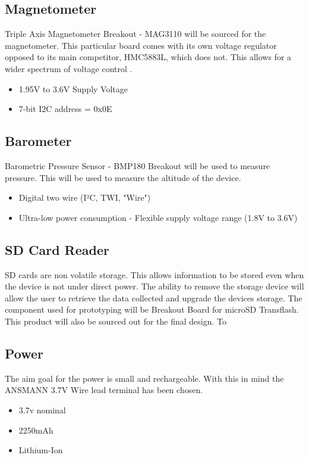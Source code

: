 \documentclass{report}
\begin{document}
\subsection{Magnetometer}
Triple Axis Magnetometer Breakout - MAG3110 will be sourced for the magnetometer. This particular board comes with its own voltage regulator opposed to its main competitor, HMC5883L, which does not. This allows for a wider spectrum of voltage control .
\begin{itemize}
\item 1.95V to 3.6V Supply Voltage
\item 7-bit I2C address = 0x0E
\end{itemize}

\subsection{Barometer}
Barometric Pressure Sensor - BMP180 Breakout will be used to measure pressure. This will be used to measure the altitude of the device. 
\begin{itemize}
\item Digital two wire (I²C, TWI, "Wire")
\item Ultra-low power consumption - Flexible supply voltage range (1.8V to 3.6V)
\end{itemize}

\subsection{SD Card Reader}
SD cards are non volatile storage. This allows information to be stored even when the device is not under direct power. The ability to remove the storage device will allow the user to retrieve the data collected and upgrade the devices storage. The component used for prototyping will be Breakout Board for microSD Transflash. This product will also be sourced out for the final design.
To 

\subsection{Power}
The aim goal for the power is small and rechargeable. With this in mind the ANSMANN 3.7V Wire lead terminal has been chosen.
\begin{itemize}
\item 3.7v nominal
\item 2250mAh
\item Lithium-Ion
\end{itemize}
\end{document}
